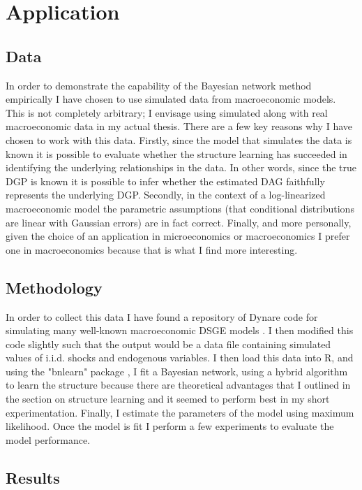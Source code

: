 \documentclass{article}
\begin{document}
\section{Application}

\subsection{Data}

In order to demonstrate the capability of the Bayesian network method empirically I have chosen to use simulated data from macroeconomic models. This is not completely arbitrary; I envisage using simulated along with real macroeconomic data in my actual thesis. There are a few key reasons why I have chosen to work with this data. Firstly, since the model that simulates the data is known it is possible to evaluate whether the structure learning has succeeded in identifying the underlying relationships in the data. In other words, since the true DGP is known it is possible to infer whether the estimated DAG faithfully represents the underlying DGP. Secondly, in the context of a log-linearized macroeconomic model the parametric assumptions (that conditional distributions are linear with Gaussian errors) are in fact correct. Finally, and more personally, given the choice of an application in microeconomics or macroeconomics I prefer one in macroeconomics because that is what I find more interesting.

\subsection{Methodology}

In order to collect this data I have found a repository of Dynare code for simulating many well-known macroeconomic DSGE models \parencite{pfeifer2020}. I then modified this code slightly such that the output would be a data file containing simulated values of i.i.d. shocks and endogenous variables. I then load this data into R, and using the "bnlearn" package \parencite{scutari2020}, I fit a Bayesian network, using a hybrid algorithm to learn the structure because there are theoretical advantages that I outlined in the section on structure learning and it seemed to perform best in my short experimentation. Finally, I estimate the parameters of the model using maximum likelihood. Once the model is fit I perform a few experiments to evaluate the model performance.

\subsection{Results}
\end{document}
